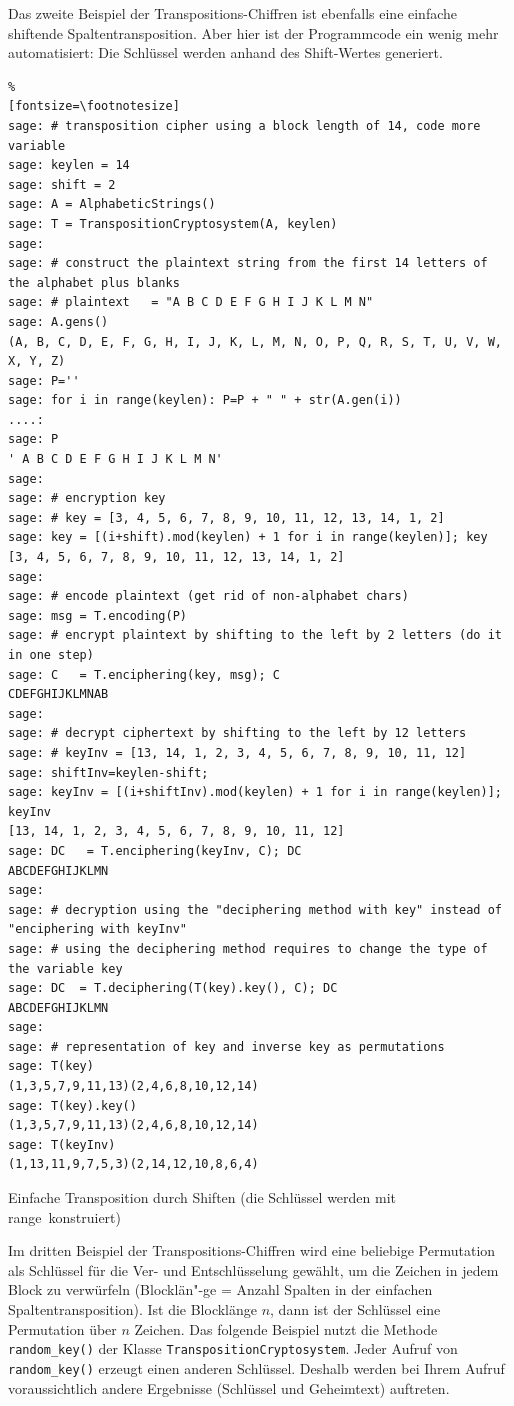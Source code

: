 \begin{refsegment}
Das zweite Beispiel der Transpositions-Chiffren ist ebenfalls eine einfache
shiftende Spaltentransposition. Aber hier ist der Programmcode ein wenig mehr
automatisiert: Die Schlüssel werden anhand des Shift-Wertes generiert.

\begin{sagecode}
\begin{Verbatim}%
[fontsize=\footnotesize]
sage: # transposition cipher using a block length of 14, code more variable
sage: keylen = 14
sage: shift = 2
sage: A = AlphabeticStrings()
sage: T = TranspositionCryptosystem(A, keylen)
sage:
sage: # construct the plaintext string from the first 14 letters of the alphabet plus blanks
sage: # plaintext   = "A B C D E F G H I J K L M N"
sage: A.gens()
(A, B, C, D, E, F, G, H, I, J, K, L, M, N, O, P, Q, R, S, T, U, V, W, X, Y, Z)
sage: P=''
sage: for i in range(keylen): P=P + " " + str(A.gen(i))
....:
sage: P
' A B C D E F G H I J K L M N'
sage:
sage: # encryption key
sage: # key = [3, 4, 5, 6, 7, 8, 9, 10, 11, 12, 13, 14, 1, 2]
sage: key = [(i+shift).mod(keylen) + 1 for i in range(keylen)]; key
[3, 4, 5, 6, 7, 8, 9, 10, 11, 12, 13, 14, 1, 2]
sage:
sage: # encode plaintext (get rid of non-alphabet chars)
sage: msg = T.encoding(P)
sage: # encrypt plaintext by shifting to the left by 2 letters (do it in one step)
sage: C   = T.enciphering(key, msg); C
CDEFGHIJKLMNAB
sage:
sage: # decrypt ciphertext by shifting to the left by 12 letters
sage: # keyInv = [13, 14, 1, 2, 3, 4, 5, 6, 7, 8, 9, 10, 11, 12]
sage: shiftInv=keylen-shift;
sage: keyInv = [(i+shiftInv).mod(keylen) + 1 for i in range(keylen)]; keyInv
[13, 14, 1, 2, 3, 4, 5, 6, 7, 8, 9, 10, 11, 12]
sage: DC   = T.enciphering(keyInv, C); DC
ABCDEFGHIJKLMN
sage:
sage: # decryption using the "deciphering method with key" instead of "enciphering with keyInv"
sage: # using the deciphering method requires to change the type of the variable key
sage: DC  = T.deciphering(T(key).key(), C); DC
ABCDEFGHIJKLMN
sage:
sage: # representation of key and inverse key as permutations
sage: T(key)
(1,3,5,7,9,11,13)(2,4,6,8,10,12,14)
sage: T(key).key()
(1,3,5,7,9,11,13)(2,4,6,8,10,12,14)
sage: T(keyInv)
(1,13,11,9,7,5,3)(2,14,12,10,8,6,4)
\end{Verbatim}
\caption{Einfache Transposition durch Shiften (die Schlüssel werden mit
         \glqq range\grqq~konstruiert)}
\end{sagecode}

Im dritten Beispiel der Transpositions-Chiffren wird eine beliebige Permutation
als Schlüssel für die Ver- und Entschlüsselung gewählt, um die Zeichen in jedem Block
zu verwürfeln (Blocklän"-ge = Anzahl Spalten in der einfachen Spaltentransposition).
Ist die Blocklänge $n$, dann ist der Schlüssel eine Permutation über $n$ Zeichen.
Das folgende Beispiel nutzt die Methode \verb!random_key()! der Klasse
\verb!TranspositionCryptosystem!.  Jeder Aufruf von \verb!random_key()! erzeugt
einen anderen Schlüssel. Deshalb werden bei Ihrem Aufruf voraussichtlich andere
Ergebnisse (Schlüssel und Geheimtext) auftreten.


\end{refsegment}
